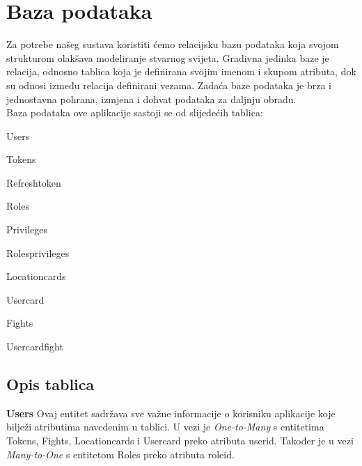 	
				
		\section{Baza podataka}
			
			
		\textnormal{Za potrebe našeg sustava koristiti ćemo relacijsku bazu podataka koja svojom strukturom 	olakšava modeliranje stvarnog svijeta. Gradivna jedinka baze je relacija, odnosno tablica koja je definirana svojim imenom i skupom atributa, dok su odnosi između relacija definirani vezama. Zadaća baze podataka je brza i jednostavna pohrana, izmjena i dohvat podataka za daljnju obradu.\\Baza podataka ove aplikacije sastoji se od slijedećih tablica:}
		
		\begin{packed_item}
			\item \textnormal{Users}
			\item \textnormal{Tokens}
			\item \textnormal{Refresh\textunderscore token}
			\item \textnormal{Roles}
			\item \textnormal{Privileges}
			\item \textnormal{Roles\textunderscore privileges}
			\item \textnormal{Location\textunderscore cards}
			\item \textnormal{User\textunderscore card}
			\item \textnormal{Fights}
			\item \textnormal{User\textunderscore  card\textunderscore fight}
		\end{packed_item}
		
			\subsection{Opis tablica}
			

				\textnormal{\textbf{Users} \quad Ovaj entitet sadržava sve važne informacije o korisniku aplikacije koje bilježi atributima navedenim u tablici. U vezi je \textit{One-to-Many} s entitetima Tokens, Fights, Location\textunderscore cards i User\textunderscore card preko atributa user\textunderscore id. Također je u vezi \textit{Many-to-One} s entitetom Roles preko atributa role\textunderscore id.} \\
				
